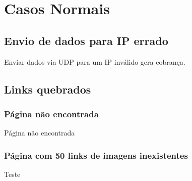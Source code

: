 \documentclass[brazil]{beamer}
\begin{document}
\section{Casos Normais}


\subsection{Envio de dados para IP errado}

\begin{frame}[fragile]
    Enviar dados via UDP para um IP inválido gera cobrança.
\end{frame}

\subsection{Links quebrados}

\begin{frame}[fragile]
    \frametitle{Página não encontrada}
    Página não encontrada
\end{frame}

\begin{frame}[fragile]
    \frametitle{Página com 50 links de imagens inexistentes}
    Teste
\end{frame}

\begin{frame}[fragile]
\end{frame}

\begin{frame}[fragile]
\end{frame}
\end{document}
